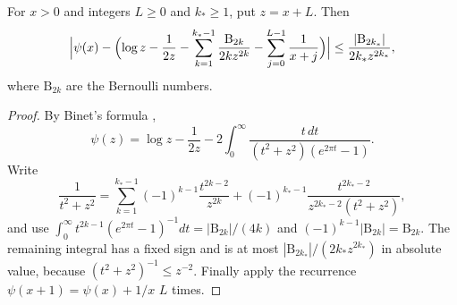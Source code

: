 \begin{lemma}\label{pf:digamma}
For $x>0$ and integers $L\ge0$ and $k_*\ge1$, put $z=x+L$. Then
\[
 \Bigl|\psi(x)-\Bigl(\log z-\frac1{2z}
 -\sum_{k=1}^{k_*-1}\frac{\mathrm B_{2k}}{2kz^{2k}}
 -\sum_{j=0}^{L-1}\frac1{x+j}\Bigr)\Bigr|
 \le\frac{|\mathrm B_{2k_*}|}{2k_*z^{2k_*}},
\]
where $\mathrm B_{2k}$ are the Bernoulli numbers.
\end{lemma}

\begin{proof}
By Binet's formula \cite[Equation~(5.9.15)]{DLMF},
\[
 \psi(z)=\log z-\frac1{2z}
 -2\int_0^\infty\frac{t\,dt}{(t^2+z^2)(e^{2\pi t}-1)} .
\]
Write
\[
 \frac1{t^2+z^2}=\sum_{k=1}^{k_*-1}(-1)^{k-1}\frac{t^{2k-2}}{z^{2k}}
 +(-1)^{k_*-1}\frac{t^{2k_*-2}}{z^{2k_*-2}(t^2+z^2)},
\]
and use $\int_0^\infty t^{2k-1}(e^{2\pi t}-1)^{-1}dt=|\mathrm B_{2k}|/(4k)$ and
$(-1)^{k-1}|\mathrm B_{2k}|=\mathrm B_{2k}$. The remaining integral has a fixed sign and
is at most $|\mathrm B_{2k_*}|/(2k_*z^{2k_*})$ in absolute value, because
$(t^2+z^2)^{-1}\le z^{-2}$. Finally apply the recurrence
$\psi(x+1)=\psi(x)+1/x$ $L$ times.
\end{proof}

